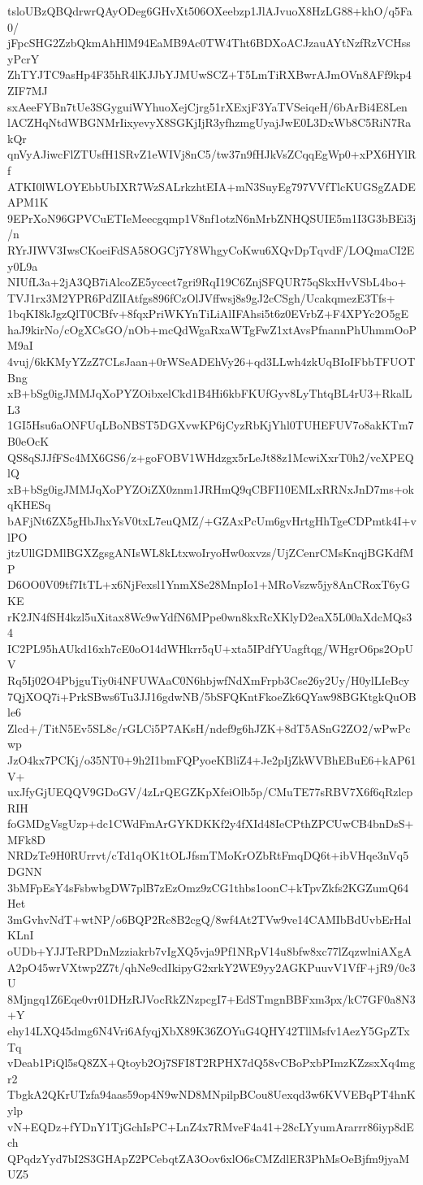 tsloUBzQBQdrwrQAyODeg6GHvXt506OXeebzp1JlAJvuoX8HzLG88+khO/q5Fa0/
jFpcSHG2ZzbQkmAhHlM94EaMB9Ac0TW4Tht6BDXoACJzauAYtNzfRzVCHssyPcrY
ZhTYJTC9asHp4F35hR4lKJJbYJMUwSCZ+T5LmTiRXBwrAJmOVn8AFf9kp4ZIF7MJ
sxAeeFYBn7tUe3SGyguiWYhuoXejCjrg51rXExjF3YaTVSeiqeH/6bArBi4E8Len
lACZHqNtdWBGNMrIixyevyX8SGKjIjR3yfhzmgUyajJwE0L3DxWb8C5RiN7RakQr
qnVyAJiwcFlZTUsfH1SRvZ1eWIVj8nC5/tw37n9fHJkVsZCqqEgWp0+xPX6HYlRf
ATKI0lWLOYEbbUbIXR7WzSALrkzhtEIA+mN3SuyEg797VVfTlcKUGSgZADEAPM1K
9EPrXoN96GPVCuETIeMeecgqmp1V8nf1otzN6nMrbZNHQSUIE5m1I3G3bBEi3j/n
RYrJIWV3IwsCKoeiFdSA58OGCj7Y8WhgyCoKwu6XQvDpTqvdF/LOQmaCI2Ey0L9a
NIUfL3a+2jA3QB7iAlcoZE5ycect7gri9RqI19C6ZnjSFQUR75qSkxHvVSbL4bo+
TVJ1rx3M2YPR6PdZlIAtfgs896fCzOlJVffwsj8s9gJ2cCSgh/UcakqmezE3Tfs+
1bqKI8kJgzQlT0CBfv+8fqxPriWKYnTiLiAlIFAhsi5t6z0EVrbZ+F4XPYc2O5gE
haJ9kirNo/cOgXCsGO/nOb+mcQdWgaRxaWTgFwZ1xtAvsPfnannPhUhmmOoPM9aI
4vuj/6kKMyYZzZ7CLsJaan+0rWSeADEhVy26+qd3LLwh4zkUqBIoIFbbTFUOTBng
xB+bSg0igJMMJqXoPYZOibxelCkd1B4Hi6kbFKUfGyv8LyThtqBL4rU3+RkalLL3
1GI5Hsu6aONFUqLBoNBST5DGXvwKP6jCyzRbKjYhl0TUHEFUV7o8akKTm7B0eOcK
QS8qSJJfFSc4MX6GS6/z+goFOBV1WHdzgx5rLeJt88z1McwiXxrT0h2/vcXPEQlQ
xB+bSg0igJMMJqXoPYZOiZX0znm1JRHmQ9qCBFI10EMLxRRNxJnD7ms+okqKHESq
bAFjNt6ZX5gHbJhxYsV0txL7euQMZ/+GZAxPcUm6gvHrtgHhTgeCDPmtk4I+vlPO
jtzUllGDMlBGXZgsgANIsWL8kLtxwoIryoHw0oxvzs/UjZCenrCMsKnqjBGKdfMP
D6OO0V09tf7ItTL+x6NjFexsl1YnmXSe28MnpIo1+MRoVszw5jy8AnCRoxT6yGKE
rK2JN4fSH4kzl5uXitax8Wc9wYdfN6MPpe0wn8kxRcXKlyD2eaX5L00aXdcMQs34
IC2PL95hAUkd16xh7cE0oO14dWHkrr5qU+xta5IPdfYUagftqg/WHgrO6ps2OpUV
Rq5Ij02O4PbjguTiy0i4NFUWAaC0N6hbjwfNdXmFrpb3Cse26y2Uy/H0ylLIeBcy
7QjXOQ7i+PrkSBws6Tu3JJ16gdwNB/5bSFQKntFkoeZk6QYaw98BGKtgkQuOBle6
Zlcd+/TitN5Ev5SL8c/rGLCi5P7AKsH/ndef9g6hJZK+8dT5ASnG2ZO2/wPwPcwp
JzO4kx7PCKj/o35NT0+9h2I1bmFQPyoeKBliZ4+Je2pIjZkWVBhEBuE6+kAP61V+
uxJfyGjUEQQV9GDoGV/4zLrQEGZKpXfeiOlb5p/CMuTE77sRBV7X6f6qRzlcpRIH
foGMDgVsgUzp+dc1CWdFmArGYKDKKf2y4fXId48IeCPthZPCUwCB4bnDsS+MFk8D
NRDzTe9H0RUrrvt/cTd1qOK1tOLJfsmTMoKrOZbRtFmqDQ6t+ibVHqe3nVq5DGNN
3bMFpEsY4sFsbwbgDW7plB7zEzOmz9zCG1thbs1oonC+kTpvZkfs2KGZumQ64Het
3mGvhvNdT+wtNP/o6BQP2Rc8B2cgQ/8wf4At2TVw9ve14CAMIbBdUvbErHalKLnI
oUDb+YJJTeRPDnMzziakrb7vIgXQ5vja9Pf1NRpV14u8bfw8xc77lZqzwlniAXgA
A2pO45wrVXtwp2Z7t/qhNe9cdIkipyG2xrkY2WE9yy2AGKPuuvV1VfF+jR9/0c3U
8Mjngq1Z6Eqe0vr01DHzRJVocRkZNzpcgI7+EdSTmgnBBFxm3px/kC7GF0a8N3+Y
ehy14LXQ45dmg6N4Vri6AfyqjXbX89K36ZOYuG4QHY42TllMsfv1AezY5GpZTxTq
vDeab1PiQl5sQ8ZX+Qtoyb2Oj7SFI8T2RPHX7dQ58vCBoPxbPImzKZzsxXq4mgr2
TbgkA2QKrUTzfa94aas59op4N9wND8MNpilpBCou8Uexqd3w6KVVEBqPT4hnKylp
vN+EQDz+fYDnY1TjGchIsPC+LnZ4x7RMveF4a41+28cLYyumArarrr86iyp8dEch
QPqdzYyd7bI2S3GHApZ2PCebqtZA3Oov6xlO6sCMZdlER3PhMsOeBjfm9jyaMUZ5
